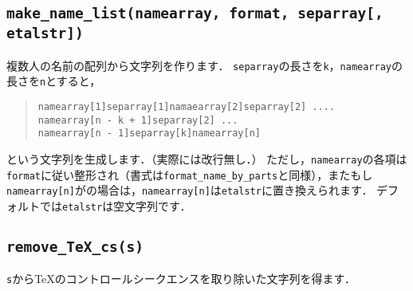 \documentclass[a4paper]{ltjsarticle}
\newcommand{\luafunc}[1]{\texttt{#1}}
\newcommand*{\luavar}[1]{\texttt{#1}}
\begin{document}
\subsection{\luafunc{make\_name\_list(namearray, format, separray[, etalstr])}}
複数人の名前の配列から文字列を作ります．
\luavar{separray}の長さを\luavar{k}，\luavar{namearray}の長さを\luavar{n}とすると，
\begin{quote}
\begin{verbatim}
namearray[1]separray[1]namaearray[2]separray[2] .... 
namearray[n - k + 1]separray[2] ...
namearray[n - 1]separray[k]namearray[n]
\end{verbatim}
\end{quote}
という文字列を生成します．（実際には改行無し．）
ただし，\luavar{namearray}の各項は\luavar{format}に従い整形され（書式は\luafunc{format\_name\_by\_parts}と同様），またもし\luavar{namearray[n]}がの場合は，\luavar{namearray[n]}は\luavar{etalstr}に置き換えられます．
デフォルトでは\luavar{etalstr}は空文字列です．

\subsection{\luafunc{remove\_TeX\_cs(s)}}
\luavar{s}から\TeX のコントロールシークエンスを取り除いた文字列を得ます．
\end{document}
